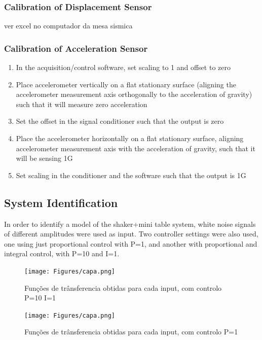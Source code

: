 \documentclass[9pt]{extarticle}
\begin{document}
\subsubsection{ Calibration of Displacement Sensor }
ver excel no computador da mesa sismica

\subsubsection{ Calibration of Acceleration Sensor }
\begin{enumerate}
    \item In the acquisition/control software, set scaling to 1 and offset to zero
    \item Place accelerometer vertically on a flat stationary surface (aligning the accelerometer measurement axis orthogonally to the acceleration of gravity) such that it will measure zero acceleration
    \item Set the offset in the signal conditioner such that the output is zero
    \item Place the accelerometer horizontally on a flat stationary surface, aligning accelerometer measurement axis with the acceleration of gravity, such that it will be sensing 1G
    \item Set scaling in the conditioner and the software such that the output is 1G
\end{enumerate}

\subsection{ System Identification }

In order to identify a model of the shaker+mini table system, white noise signals of different amplitudes were used as input. Two controller settings were also used, one using just proportional control with P=1, and another with proportional and integral control, with P=10 and I=1.

\begin{figure}[H]
\begin{minipage}{0.49\textwidth}
        \centering
    \texttt{[image: Figures/capa.png]}
    \caption{Funções de trânsferencia obtidas para cada input, com controlo P=10 I=1}
    \label{fig_sine_nonlinearity}
\end{minipage}
\hfill
\begin{minipage}{0.49\textwidth}
    \centering
    \texttt{[image: Figures/capa.png]}
    \caption{Funções de trânsferencia obtidas para cada input, com controlo P=1}
    \label{fig_square_nonlinearity}
\end{minipage}
\end{figure}
\end{document}
